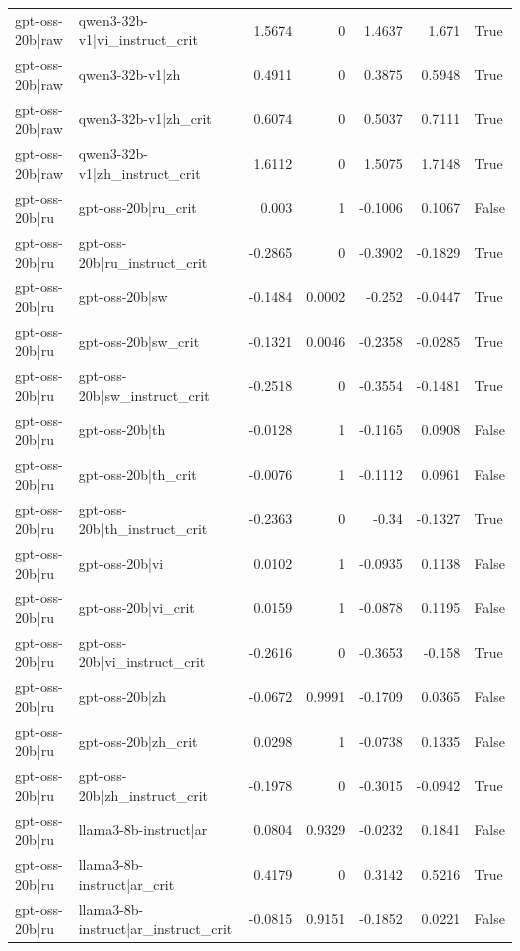 \begin{table}
\begin{tabular}{l l r r r r l}
gpt-oss-20b|raw & qwen3-32b-v1|vi_instruct_crit & 1.5674 & 0 & 1.4637 & 1.671 & True \\
gpt-oss-20b|raw & qwen3-32b-v1|zh & 0.4911 & 0 & 0.3875 & 0.5948 & True \\
gpt-oss-20b|raw & qwen3-32b-v1|zh_crit & 0.6074 & 0 & 0.5037 & 0.7111 & True \\
gpt-oss-20b|raw & qwen3-32b-v1|zh_instruct_crit & 1.6112 & 0 & 1.5075 & 1.7148 & True \\
gpt-oss-20b|ru & gpt-oss-20b|ru_crit & 0.003 & 1 & -0.1006 & 0.1067 & False \\
gpt-oss-20b|ru & gpt-oss-20b|ru_instruct_crit & -0.2865 & 0 & -0.3902 & -0.1829 & True \\
gpt-oss-20b|ru & gpt-oss-20b|sw & -0.1484 & 0.0002 & -0.252 & -0.0447 & True \\
gpt-oss-20b|ru & gpt-oss-20b|sw_crit & -0.1321 & 0.0046 & -0.2358 & -0.0285 & True \\
gpt-oss-20b|ru & gpt-oss-20b|sw_instruct_crit & -0.2518 & 0 & -0.3554 & -0.1481 & True \\
gpt-oss-20b|ru & gpt-oss-20b|th & -0.0128 & 1 & -0.1165 & 0.0908 & False \\
gpt-oss-20b|ru & gpt-oss-20b|th_crit & -0.0076 & 1 & -0.1112 & 0.0961 & False \\
gpt-oss-20b|ru & gpt-oss-20b|th_instruct_crit & -0.2363 & 0 & -0.34 & -0.1327 & True \\
gpt-oss-20b|ru & gpt-oss-20b|vi & 0.0102 & 1 & -0.0935 & 0.1138 & False \\
gpt-oss-20b|ru & gpt-oss-20b|vi_crit & 0.0159 & 1 & -0.0878 & 0.1195 & False \\
gpt-oss-20b|ru & gpt-oss-20b|vi_instruct_crit & -0.2616 & 0 & -0.3653 & -0.158 & True \\
gpt-oss-20b|ru & gpt-oss-20b|zh & -0.0672 & 0.9991 & -0.1709 & 0.0365 & False \\
gpt-oss-20b|ru & gpt-oss-20b|zh_crit & 0.0298 & 1 & -0.0738 & 0.1335 & False \\
gpt-oss-20b|ru & gpt-oss-20b|zh_instruct_crit & -0.1978 & 0 & -0.3015 & -0.0942 & True \\
gpt-oss-20b|ru & llama3-8b-instruct|ar & 0.0804 & 0.9329 & -0.0232 & 0.1841 & False \\
gpt-oss-20b|ru & llama3-8b-instruct|ar_crit & 0.4179 & 0 & 0.3142 & 0.5216 & True \\
gpt-oss-20b|ru & llama3-8b-instruct|ar_instruct_crit & -0.0815 & 0.9151 & -0.1852 & 0.0221 & False \\

\end{tabular}
\end{table}
